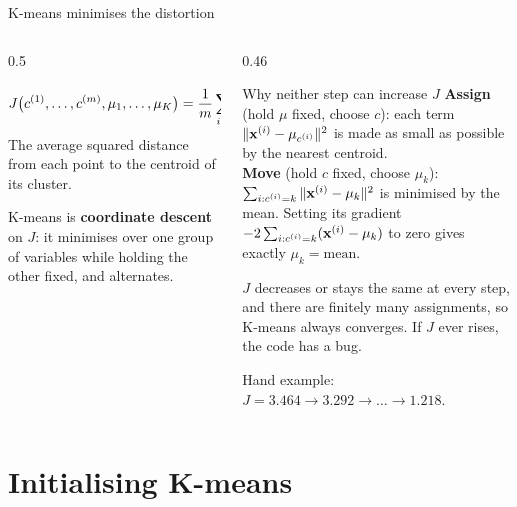 \documentclass[aspectratio=169,10pt]{beamer}
\begin{document}
\begin{frame}{K-means minimises the distortion}
  \begin{columns}[T,onlytextwidth]
    \begin{column}{0.5\textwidth}
      \begin{defnbox}
        \small
        \[ J\bigl(c^{(1)},\dots,c^{(m)},\mu_1,\dots,\mu_K\bigr)
           =\frac1m\sum_{i=1}^{m}\bigl\|\mathbf{x}^{(i)}-\mu_{c^{(i)}}\bigr\|^2 \]
        The average squared distance from each point to the centroid of its cluster.
      \end{defnbox}
      \footnotesize
      K-means is \textbf{coordinate descent} on $J$: it minimises over one group of
      variables while holding the other fixed, and alternates.
    \end{column}
    \begin{column}{0.46\textwidth}
      \footnotesize
      \begin{block}{Why neither step can increase $J$}
        \textbf{Assign} (hold $\mu$ fixed, choose $c$): each term
        $\|\mathbf{x}^{(i)}-\mu_{c^{(i)}}\|^2$ is made as small as possible by the nearest
        centroid.\\[3pt]
        \textbf{Move} (hold $c$ fixed, choose $\mu_k$): $\sum_{i:c^{(i)}=k}\|\mathbf{x}^{(i)}-\mu_k\|^2$
        is minimised by the mean. Setting its gradient
        $-2\sum_{i:c^{(i)}=k}(\mathbf{x}^{(i)}-\mu_k)$ to zero gives exactly
        $\mu_k=\text{mean}$.
      \end{block}
      \begin{keyidea}[Consequences]
        $J$ decreases or stays the same at every step, and there are finitely many
        assignments, so K-means always converges. If $J$ ever rises, the code has a bug.
      \end{keyidea}
      Hand example: $J=3.464\to3.292\to\dots\to1.218$.
    \end{column}
  \end{columns}
\end{frame}

\section{Initialising K-means}
\end{document}
